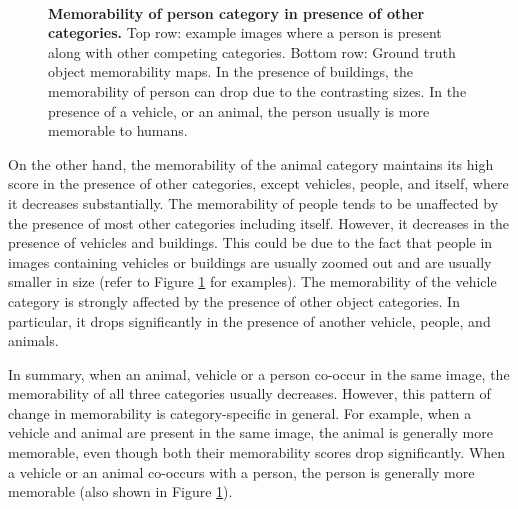 \begin{figure}[!htb]
\centering
{}
\\
\vspace{-2mm}
\vspace{-5mm}\caption{\footnotesize\textbf{Memorability of person category in presence of other categories.} Top row: example images where a person is present along with other competing categories. Bottom row: Ground truth object memorability maps. In the presence of buildings, the memorability of person can drop due to the contrasting sizes. In the presence of a vehicle, or an animal, the person usually is more memorable to humans. }\label{fig:qualInterClass}
\end{figure}

On the other hand, the memorability of the animal category maintains its high score in the presence of other categories, except vehicles, people, and itself, where it decreases substantially. The memorability of people tends to be unaffected by the presence of most other categories including itself. However, it decreases in the presence of vehicles and buildings. This could be due to the fact that people in images containing vehicles or buildings are usually zoomed out and are usually smaller in size (refer to Figure \ref{fig:qualInterClass} for  examples). The memorability of the vehicle category is strongly affected by the presence of other object categories. In particular, it drops significantly in the presence of another vehicle, people, and animals.

In summary, when an animal, vehicle or a person co-occur in the same image, the memorability of all three categories usually decreases. However, this pattern of change in memorability is category-specific in general. For example, when a vehicle and animal are present in the same image, the animal is generally more memorable, even though both their memorability scores drop significantly. When a vehicle or an animal co-occurs with a person, the person is generally more memorable (also shown in Figure \ref{fig:qualInterClass}).





